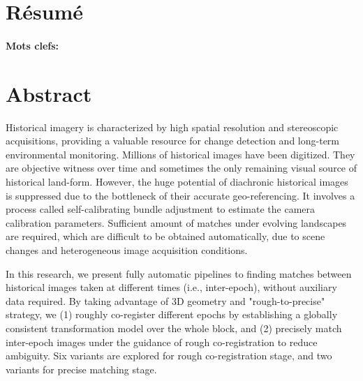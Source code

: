 \documentclass[a4paper,11pt,twoside]{ThesisStyle}
\begin{document}




\setcounter{page}{0}
\cleardoublepage
\section*{Résumé}

\paragraph{Mots clefs:} 

\newpage

\section*{Abstract}
Historical imagery is characterized by high spatial resolution and stereoscopic acquisitions, providing a valuable resource for change detection and long-term environmental monitoring. Millions of historical images have been digitized. They are objective witness over time and sometimes the only remaining visual source of historical land-form. However, the huge potential of diachronic historical images is suppressed due to the bottleneck of their accurate geo-referencing.
It involves a process called self-calibrating bundle adjustment to estimate the camera calibration parameters. Sufficient amount of matches under evolving landscapes are required, which are difficult to be obtained automatically, due to scene changes and heterogeneous image acquisition conditions.
\par
In this research, we present fully automatic pipelines to finding matches between historical images taken at different times (i.e., inter-epoch), without auxiliary data required. 
By taking advantage of 3D geometry and "rough-to-precise" strategy, we (1) roughly co-register different epochs by establishing a globally consistent transformation model over the whole block, and (2) precisely match inter-epoch images under the guidance of rough co-registration to reduce ambiguity. Six variants are explored for rough co-registration stage, and two variants for precise matching stage. 
\end{document}
